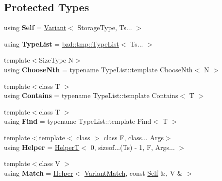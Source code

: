 \subsection*{Protected Types}
\begin{DoxyCompactItemize}
\item 
\mbox{\label{classbzd_1_1impl_1_1Variant_a00c41a0c69c297d1a080df68815b188e}} 
using {\bfseries Self} = \hyperlink{classbzd_1_1impl_1_1Variant}{Variant}$<$ Storage\+Type, Ts... $>$
\item 
\mbox{\label{classbzd_1_1impl_1_1Variant_a9278f2fa989268e6009e5fa792a94afa}} 
using {\bfseries Type\+List} = \hyperlink{structbzd_1_1tmp_1_1TypeList}{bzd\+::tmp\+::\+Type\+List}$<$ Ts... $>$
\item 
\mbox{\label{classbzd_1_1impl_1_1Variant_ae11d4179ac1a3026f4117b5e8addb91e}} 
{\footnotesize template$<$Size\+Type N$>$ }\\using {\bfseries Choose\+Nth} = typename Type\+List\+::template Choose\+Nth$<$ N $>$
\item 
\mbox{\label{classbzd_1_1impl_1_1Variant_a33736feeb662d022ff31ccc192770ba2}} 
{\footnotesize template$<$class T $>$ }\\using {\bfseries Contains} = typename Type\+List\+::template Contains$<$ T $>$
\item 
\mbox{\label{classbzd_1_1impl_1_1Variant_a22c8cde3db48bc6bc17b9dfae7c00dfe}} 
{\footnotesize template$<$class T $>$ }\\using {\bfseries Find} = typename Type\+List\+::template Find$<$ T $>$
\item 
\mbox{\label{classbzd_1_1impl_1_1Variant_aa7a2fc3a5d560c79c78e26fdf56a5996}} 
{\footnotesize template$<$template$<$ class $>$ class F, class... Args$>$ }\\using {\bfseries Helper} = \hyperlink{structbzd_1_1impl_1_1Variant_1_1HelperT}{HelperT}$<$ 0, sizeof...(Ts) -\/ 1, F, Args... $>$
\item 
\mbox{\label{classbzd_1_1impl_1_1Variant_a6076c32bbf520055a3a8922b1156800c}} 
{\footnotesize template$<$class V $>$ }\\using {\bfseries Match} = \hyperlink{structbzd_1_1impl_1_1Variant_1_1HelperT}{Helper}$<$ \hyperlink{structbzd_1_1impl_1_1Variant_1_1VariantMatch}{Variant\+Match}, const \hyperlink{classbzd_1_1impl_1_1Variant}{Self} \&, V \& $>$
\end{DoxyCompactItemize}
